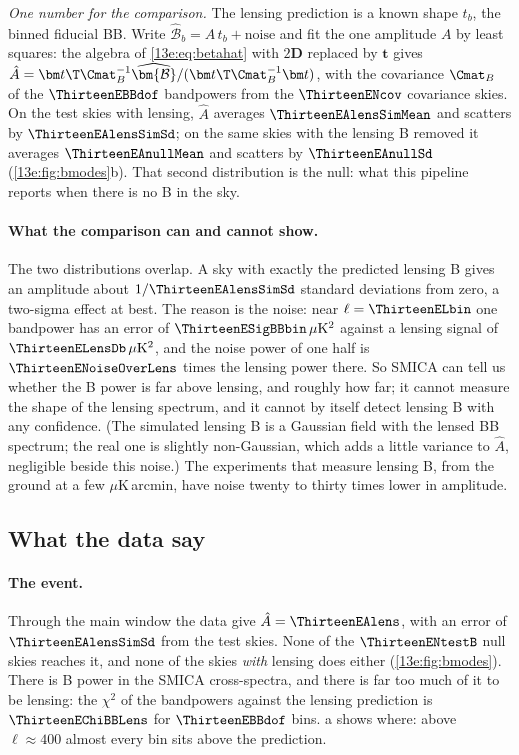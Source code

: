 \emph{One number for the comparison.} The lensing prediction is a known shape $t_b$, the binned fiducial BB.
Write $\widehat{\mathcal B}_b=A\,t_b+\text{noise}$ and fit the one amplitude $A$ by least squares: the algebra of
\eqref{13e:eq:betahat} with $2\bm D$ replaced by $\bm t$ gives
$\hat A=\bm t\T\Cmat_B^{-1}\widehat{\bm{\mathcal B}}/(\bm t\T\Cmat_B^{-1}\bm t)$, with the covariance $\Cmat_B$ of the
$\ThirteenEBBdof$ bandpowers from the $\ThirteenENcov$ covariance skies. On the test skies with lensing, $\hat A$
averages $\ThirteenEAlensSimMean$ and scatters by $\ThirteenEAlensSimSd$; on the same skies with the lensing B
removed it averages $\ThirteenEAnullMean$ and scatters by $\ThirteenEAnullSd$ (\cref{13e:fig:bmodes}b). That
second distribution is the null: what this pipeline reports when there is no B in the sky.

\paragraph{What the comparison can and cannot show.} The two distributions overlap. A sky with exactly the
predicted lensing B gives an amplitude about $1/\ThirteenEAlensSimSd$ standard deviations from zero, a two-sigma
effect at best. The reason is the noise: near $\ell=\ThirteenELbin$ one bandpower has an error of
$\ThirteenESigBBbin\,\mu{\rm K}^2$ against a lensing signal of $\ThirteenELensDb\,\mu{\rm K}^2$, and the noise
power of one half is $\ThirteenENoiseOverLens$ times the lensing power there. So SMICA can tell us whether the B
power is far above lensing, and roughly how far; it cannot measure the shape of the lensing spectrum, and it cannot
by itself detect lensing B with any confidence. (The simulated lensing B is a Gaussian field with the lensed
BB spectrum; the real one is slightly non-Gaussian, which adds a little variance to $\hat A$, negligible beside
this noise.) The experiments that measure lensing B, from the ground at a few
$\mu$K\,arcmin, have noise twenty to thirty times lower in amplitude.

\subsection{What the data say}
\label{13e:sec:bb-data}

\paragraph{The event.} Through the main window the data give $\hat A=\ThirteenEAlens$, with an error of
$\ThirteenEAlensSimSd$ from the test skies. None of the $\ThirteenENtestB$ null skies reaches it, and none of the
skies \emph{with} lensing does either (\cref{13e:fig:bmodes}). There is B power in the SMICA cross-spectra, and
there is far too much of it to be lensing: the $\chi^2$ of the bandpowers against the lensing prediction is
$\ThirteenEChiBBLens$ for $\ThirteenEBBdof$ bins. a shows where: above
$\ell\approx400$ almost every bin sits above the prediction.

